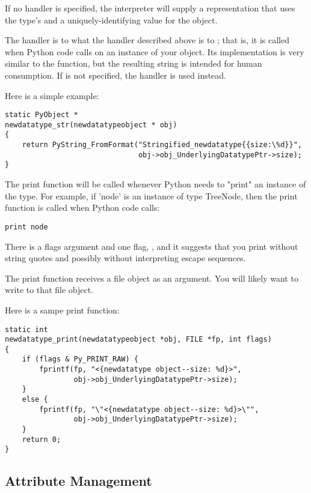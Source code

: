 If no  handler is specified, the interpreter will
supply a representation that uses the type's  and a
uniquely-identifying value for the object.

The  handler is to  what the
 handler described above is to ; that
is, it is called when Python code calls  on an
instance of your object.  Its implementation is very similar to the
 function, but the resulting string is intended for
human consumption.  If  is not specified, the
 handler is used instead.

Here is a simple example:

\begin{verbatim}
static PyObject *
newdatatype_str(newdatatypeobject * obj)
{
    return PyString_FromFormat("Stringified_newdatatype{{size:\%d}}",
                               obj->obj_UnderlyingDatatypePtr->size);
}
\end{verbatim}

The print function will be called whenever Python needs to "print" an
instance of the type.  For example, if 'node' is an instance of type
TreeNode, then the print function is called when Python code calls:

\begin{verbatim}
print node
\end{verbatim}

There is a flags argument and one flag, , and
it suggests that you print without string quotes and possibly without
interpreting escape sequences.

The print function receives a file object as an argument. You will
likely want to write to that file object.

Here is a sampe print function:

\begin{verbatim}
static int
newdatatype_print(newdatatypeobject *obj, FILE *fp, int flags)
{
    if (flags & Py_PRINT_RAW) {
        fprintf(fp, "<{newdatatype object--size: %d}>",
                obj->obj_UnderlyingDatatypePtr->size);
    }
    else {
        fprintf(fp, "\"<{newdatatype object--size: %d}>\"",
                obj->obj_UnderlyingDatatypePtr->size);
    }
    return 0;
}
\end{verbatim}


\subsection{Attribute Management}

